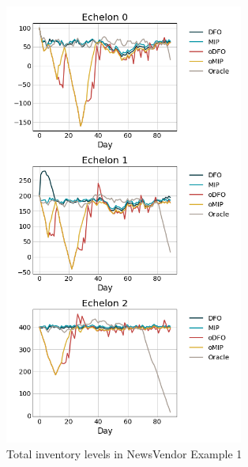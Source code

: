 \documentclass[12pt]{article}
\begin{document}
\begin{figure}[!htbp]
    \centering
    \includegraphics[width=0.7\textwidth]{NewsVendor_Backlog_inventory.png}
    \caption{Total inventory levels in NewsVendor Example 1}
    \label{fig:NV_backlog_inv}
\end{figure}
\end{document}
